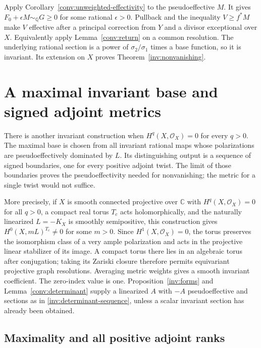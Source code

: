 Apply Corollary~\ref{conv:unweighted-effectivity} to the pseudoeffective
$M$.  It gives $F_0+\epsilon M\sim_{\mathbb Q}G\ge0$ for some
rational $\epsilon>0$.  Pullback and the inequality $V\ge f^*M$
make $V$ effective after a principal correction from $Y$ and a divisor
exceptional over $X$.  Equivalently apply Lemma~\ref{conv:return} on
a common resolution.  The underlying rational section is a power of
$\sigma_2/\sigma_1$ times a base function, so it is invariant.
Its extension on $X$ proves Theorem~\ref{inv:nonvanishing}.

\section{A maximal invariant base and signed adjoint metrics}
\label{inv:dominated-alternative}

There is another invariant construction when
$H^q(X,\mathcal O_X)=0$ for every $q>0$.  The maximal base is chosen
from all invariant rational maps whose polarizations are
pseudoeffectively dominated by $L$.  Its distinguishing output is a
sequence of signed boundaries, one for every positive adjoint twist.
The limit of those boundaries proves the pseudoeffectivity needed for
nonvanishing; the metric for a single twist would not suffice.

More precisely, if $X$ is smooth connected projective over $\mathbb C$
with $H^q(X,\mathcal O_X)=0$ for all $q>0$, a compact real torus
$T_c$ acts holomorphically, and the naturally linearized $L=-K_X$
is smoothly semipositive, this construction gives
$H^0(X,mL)^{T_c}\ne0$ for some $m>0$.  Since
$H^1(X,\mathcal O_X)=0$, the torus preserves the
isomorphism class of a very ample polarization and acts in the
projective linear stabilizer of its image.  A compact torus there lies
in an algebraic torus after conjugation; taking its Zariski closure
therefore permits equivariant projective graph resolutions.  Averaging
metric weights gives a smooth invariant coefficient.  The zero-index
value is one.  Proposition~\ref{inv:forms} and
Lemma~\ref{conv:determinant} supply a linearized $A$ with $-A$
pseudoeffective and sections as in
\eqref{inv:determinant-sequence}, unless a scalar invariant section
has already been obtained.

\subsection{Maximality and all positive adjoint ranks}

